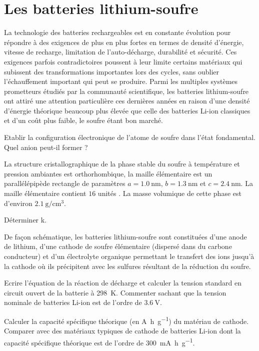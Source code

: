 \section{Les batteries lithium-soufre}

\setcounter{equation}{0}
\setcounter{Q}{0}

La technologie des batteries rechargeables est en constante évolution pour répondre à des exigences de plus en plus fortes en termes de densité d'énergie, vitesse de recharge, limitation de l'auto-décharge, durabilité et sécurité. Ces exigences parfois contradictoires poussent à leur limite certains matériaux qui subissent des transformations importantes lors des cycles, sans oublier l'échauffement important qui peut se produire. Parmi les multiples systèmes prometteurs étudiés par la communauté scientifique, les batteries lithium-soufre ont attiré une attention particulière ces dernières années en raison d'une densité d'énergie théorique beaucoup plus élevée que celle des batteries Li-ion classiques et d'un coût plus faible, le soufre étant bon marché.

\Q Etablir la configuration électronique de l'atome de soufre dans l'état fondamental. Quel anion peut-il former ?

La structure cristallographique de la phase stable du soufre à température et pression ambiantes est orthorhombique, la maille élémentaire est un parallélépipède rectangle de paramètres $a=1.0 ~ \si{\nano\meter}$, $b=1.3 ~ \si{\nano\meter}$ et $c=2.4 ~ \si{\nano\meter}$. La maille élémentaire contient $16$ unités . La masse volumique de cette phase est d'environ $2.1 ~ \si{\gram\per\centi\meter\cubed}$.

\Q Déterminer k.

De façon schématique, les batteries lithium-soufre sont constituées d'une anode de lithium, d'une cathode de soufre élémentaire (dispersé dans du carbone conducteur) et d'un électrolyte organique permettant le transfert des ions  jusqu'à la cathode où ils précipitent avec les sulfures résultant de la réduction du soufre.

\Q Ecrire l'équation de la réaction de décharge et calculer la tension standard en circuit ouvert de la batterie à \SI{298}{\kelvin}. Commenter sachant que la tension nominale de batteries Li-ion est de l'ordre de $3.6 ~ \si{\volt}$.

\Q Calculer la capacité spécifique théorique (en \si{\ampere\hour\per\gram}) du matériau de cathode. Comparer avec des matériaux typiques de cathode de batteries Li-ion dont la capacité spécifique théorique est de l'ordre de \SI{300}{\milli\ampere\hour\per\gram}.

